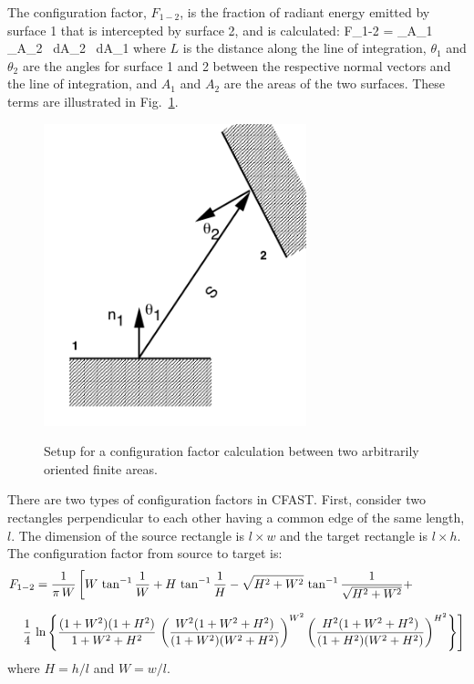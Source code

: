 \documentclass[12pt]{book}
\begin{document}
The configuration factor, $F_{1-2}$, is the fraction of radiant energy emitted by surface 1 that is intercepted by  surface 2, and is calculated:
\be
   F_{1-2} =  \int_{A_1} \int_{A_2}  \, dA_2 \, dA_1 \label{eq:config_factor}
\ee
where $L$ is the distance along the line of integration,  $\theta_1$ and $\theta_2$ are the angles for surface 1 and 2 between the respective normal vectors and the line of integration, and $A_1$ and $A_2$ are the areas of the two surfaces.  These terms are illustrated in Fig.~\ref{fig:Rad_Config_Factor}.
\begin{figure}
\begin{center}
\includegraphics[width=3.0in]{FIGURES/Theory/Radiation_Config_Factor}\\
\end{center}
\caption{Setup for a configuration factor calculation between two arbitrarily oriented finite areas.}
 \label{fig:Rad_Config_Factor}
\end{figure}
There are two types of configuration factors in CFAST. First, consider two rectangles perpendicular to each other having a common edge of the same length, $l$. The dimension of the source rectangle is $l \times w$ and the target rectangle is $l \times h$. The configuration factor from source to target is:
\begin{eqnarray}
\lefteqn{F_{1-2} = \frac{1}{\pi \, W} \left[ W \, \tan^{-1} \frac{1}{W} + H \, \tan^{-1} \frac{1}{H} - \sqrt{H^2+W^2} \, \tan^{-1} \frac{1}{\sqrt{H^2+W^2}} + \right.}  \nonumber \\[.1in]
& &   \left. \frac{1}{4} \, \ln \left\{ \frac{(1+W^2)(1+H^2)}{1+W^2+H^2} \, \left( \frac{W^2(1+W^2+H^2)}{(1+W^2)(W^2+H^2)} \right)^{W^2} \left( \frac{H^2(1+W^2+H^2)}{(1+H^2)(W^2+H^2)} \right)^{H^2} \right\} \right]
\end{eqnarray}
where $H=h/l$ and $W=w/l$.
\end{document}
